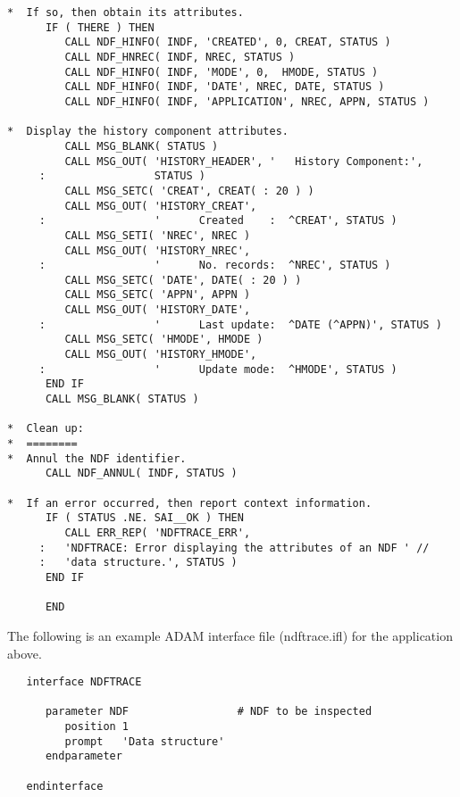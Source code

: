 \documentclass[twoside,11pt]{article}
\newcommand{\xref}[3]{#1}
\begin{document}
\begin{verbatim}
*  If so, then obtain its attributes.
      IF ( THERE ) THEN
         CALL NDF_HINFO( INDF, 'CREATED', 0, CREAT, STATUS )
         CALL NDF_HNREC( INDF, NREC, STATUS )
         CALL NDF_HINFO( INDF, 'MODE', 0,  HMODE, STATUS )
         CALL NDF_HINFO( INDF, 'DATE', NREC, DATE, STATUS )
         CALL NDF_HINFO( INDF, 'APPLICATION', NREC, APPN, STATUS )

*  Display the history component attributes.
         CALL MSG_BLANK( STATUS )
         CALL MSG_OUT( 'HISTORY_HEADER', '   History Component:',
     :                 STATUS )
         CALL MSG_SETC( 'CREAT', CREAT( : 20 ) )
         CALL MSG_OUT( 'HISTORY_CREAT',
     :                 '      Created    :  ^CREAT', STATUS )
         CALL MSG_SETI( 'NREC', NREC )
         CALL MSG_OUT( 'HISTORY_NREC',
     :                 '      No. records:  ^NREC', STATUS )
         CALL MSG_SETC( 'DATE', DATE( : 20 ) )
         CALL MSG_SETC( 'APPN', APPN )
         CALL MSG_OUT( 'HISTORY_DATE',
     :                 '      Last update:  ^DATE (^APPN)', STATUS )
         CALL MSG_SETC( 'HMODE', HMODE )
         CALL MSG_OUT( 'HISTORY_HMODE',
     :                 '      Update mode:  ^HMODE', STATUS )
      END IF
      CALL MSG_BLANK( STATUS )

*  Clean up:
*  ========
*  Annul the NDF identifier.
      CALL NDF_ANNUL( INDF, STATUS )

*  If an error occurred, then report context information.
      IF ( STATUS .NE. SAI__OK ) THEN
         CALL ERR_REP( 'NDFTRACE_ERR',
     :   'NDFTRACE: Error displaying the attributes of an NDF ' //
     :   'data structure.', STATUS )
      END IF

      END
\end{verbatim}
\normalsize

The following is an example \xref{ADAM}{sg4}{} interface file
(ndftrace.ifl) for the application above. 

\small
\begin{verbatim}
   interface NDFTRACE

      parameter NDF                 # NDF to be inspected
         position 1
         prompt   'Data structure'
      endparameter

   endinterface
\end{verbatim}
\normalsize
\end{document}
